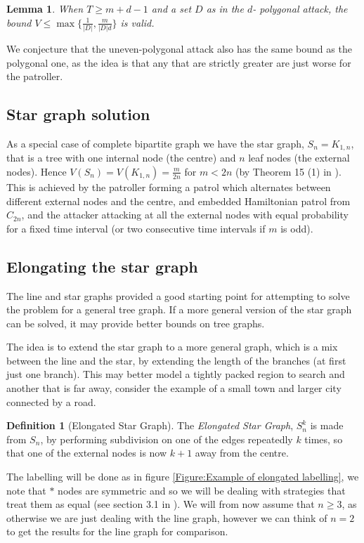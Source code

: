 \documentclass[a4paper,10pt]{article}
\newtheorem{lemma}[theorem]{Lemma}
\theoremstyle{definition}
\newtheorem{definition}[theorem]{Definition}
\theoremstyle{definition}
\theoremstyle{remark}
\theoremstyle{definition}
\begin{document}
\begin{lemma}
When $T \geq m+d-1$ and a set $D$ as in the $d$- polygonal attack, the bound $V \leq \max \{ \frac{1}{|D|} , \frac{m}{|D|d} \}$ is valid.
\end{lemma}

We conjecture that the uneven-polygonal attack also has the same bound as the polygonal one, as the idea is that any that are strictly greater are just worse for the patroller.

\subsection{Star graph solution}
As a special case of complete bipartite graph we have the star graph, $S_{n}=K_{1,n}$, that is a tree with one internal node (the centre) and $n$ leaf nodes (the external nodes). Hence $V(S_{n})=V(K_{1,n})=\frac{m}{2n}$ for $m<2n$ (by Theorem 15 (1) in \cite{Lin2013}). This is achieved by the patroller forming a patrol which alternates between different  external nodes and the centre, and embedded Hamiltonian patrol from $C_{2n}$, and the attacker attacking at all the external nodes with equal probability for a fixed time interval (or two consecutive time intervals if $m$ is odd).

\subsection{Elongating the star graph}
The line and star graphs provided a good starting point for attempting to solve the problem for a general tree graph. If a more general version of the star graph can be solved, it may provide better bounds on tree graphs. 

The idea is to extend the star graph to a more general graph, which is a mix between the line and the star, by extending the length of the branches (at first just one branch). This may better model a tightly packed region to search and another that is far away, consider the example of a small town and larger city connected by a road. 

\begin{definition}[Elongated Star Graph]
The \textit{Elongated Star Graph}, $S_{n}^{k}$ is made from $S_{n}$, by performing subdivision on one of the edges repeatedly $k$ times, so that one of the external nodes is now $k+1$ away from the centre.
\end{definition}

The labelling will be done as in figure \ref{Figure:Example of elongated labelling}, we note that $*$ nodes are symmetric and so we will be dealing with strategies that treat them as equal (see section 3.1 in \cite{Lin2013}). We will from now assume that $n \geq 3$, as otherwise we are just dealing with the line graph, however we can think of $n=2$ to get the results for the line graph for comparison.
\end{document}
